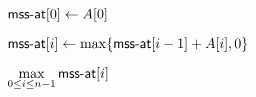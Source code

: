 
\begin{algorithm}[H]
  \begin{algorithmic}[1]
      \State $\textsf{mss-at}[0] \gets A[0]$

      \hStatex
        \State $\textsf{mss-at}[i] \gets \max\{\textsf{mss-at}[i-1] + A[i], 0\}$
      \EndFor

      \hStatex
      \State \Return $\max\limits_{0 \le i \le n-1} \textsf{mss-at}[i]$
    \EndProcedure
  \end{algorithmic}
\end{algorithm}